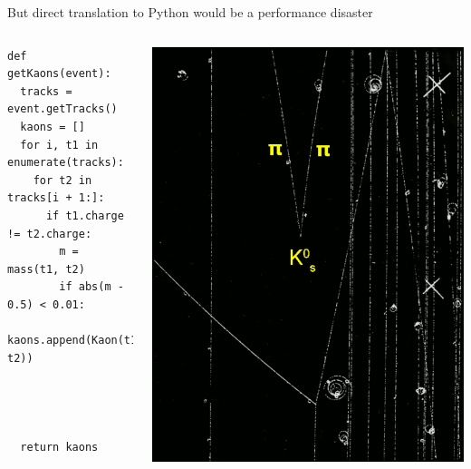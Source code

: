 \documentclass[aspectratio=169]{beamer}
\begin{document}
\begin{frame}[fragile]{But direct translation to Python would be a performance disaster}
\vspace{0.25 cm}
\begin{columns}[b]
\begin{verbatim}
def getKaons(event):
  tracks = event.getTracks()
  kaons = []
  for i, t1 in enumerate(tracks):
    for t2 in tracks[i + 1:]:
      if t1.charge != t2.charge:
        m = mass(t1, t2)
        if abs(m - 0.5) < 0.01:
          kaons.append(Kaon(t1, t2))




  return kaons

\end{verbatim}

\vspace{0.1 cm}

\includegraphics[width=\linewidth]{kshort-1.png}
\end{columns}
\end{frame}
\end{document}
